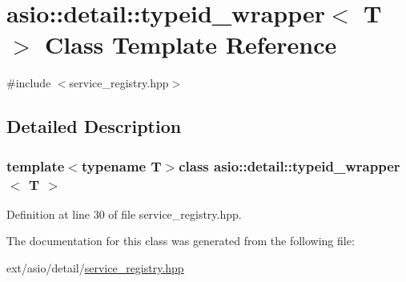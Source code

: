 \hypertarget{classasio_1_1detail_1_1typeid__wrapper}{}\section{asio\+:\+:detail\+:\+:typeid\+\_\+wrapper$<$ T $>$ Class Template Reference}
\label{classasio_1_1detail_1_1typeid__wrapper}


{\ttfamily \#include $<$service\+\_\+registry.\+hpp$>$}



\subsection{Detailed Description}
\subsubsection*{template$<$typename T$>$class asio\+::detail\+::typeid\+\_\+wrapper$<$ T $>$}



Definition at line 30 of file service\+\_\+registry.\+hpp.



The documentation for this class was generated from the following file\+:\begin{DoxyCompactItemize}
\item 
ext/asio/detail/\hyperlink{service__registry_8hpp}{service\+\_\+registry.\+hpp}\end{DoxyCompactItemize}
